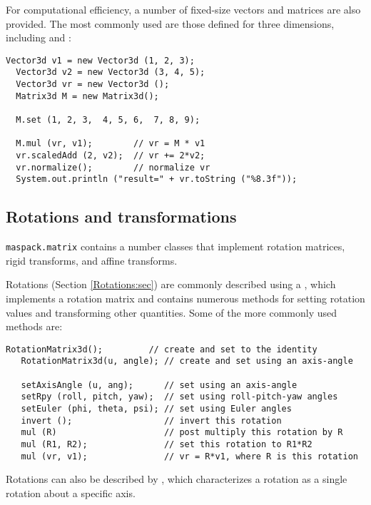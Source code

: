 For computational efficiency, a number of fixed-size vectors and
matrices are also provided. The most commonly used are those defined
for three dimensions, including 
and :
%
\begin{lstlisting}[]
  Vector3d v1 = new Vector3d (1, 2, 3);
  Vector3d v2 = new Vector3d (3, 4, 5);
  Vector3d vr = new Vector3d ();
  Matrix3d M = new Matrix3d();

  M.set (1, 2, 3,  4, 5, 6,  7, 8, 9);

  M.mul (vr, v1);        // vr = M * v1
  vr.scaledAdd (2, v2);  // vr += 2*v2;
  vr.normalize();        // normalize vr
  System.out.println ("result=" + vr.toString ("%8.3f"));
\end{lstlisting}
%

\subsection{Rotations and transformations}
\label{RigidTransform3d:sec}

{\tt maspack.matrix} contains a number classes that implement rotation
matrices, rigid transforms, and affine transforms. 

Rotations (Section \ref{Rotations:sec}) are commonly described using a
, which implements a
rotation matrix and contains numerous methods for setting rotation
values and transforming other quantities. Some of the more commonly
used methods are:
%
\begin{lstlisting}[]
   RotationMatrix3d();         // create and set to the identity
   RotationMatrix3d(u, angle); // create and set using an axis-angle

   setAxisAngle (u, ang);      // set using an axis-angle
   setRpy (roll, pitch, yaw);  // set using roll-pitch-yaw angles
   setEuler (phi, theta, psi); // set using Euler angles
   invert ();                  // invert this rotation
   mul (R)                     // post multiply this rotation by R
   mul (R1, R2);               // set this rotation to R1*R2
   mul (vr, v1);               // vr = R*v1, where R is this rotation
\end{lstlisting}
%
Rotations can also be described by
, which characterizes a rotation
as a single rotation about a specific axis.

